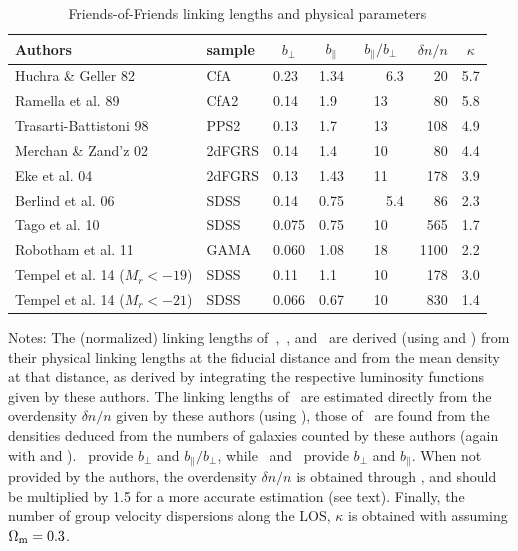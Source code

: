 \begin{table}
\caption{Friends-of-Friends linking lengths and physical
parameters\label{tab:groupalgos}}
\begin{center}
\setlength{\tabcolsep}{2.5pt}
\begin{tabular}{llllcrl}
\toprule%
\toprule%
Authors & sample & \multicolumn{1}{c}{$b_\perp$} & \multicolumn{1}{c}{$b_\parallel$} &
\multicolumn{1}{c}{$b_\parallel/b_\perp$} & $\delta n/
n$ & \multicolumn{1}{c}{$\kappa$} \\
\toprule%
Huchra \& Geller 82     & CfA     & 0.23  & 1.34  & \ \ \ \ 6.3  & 20    & 5.7 \\
Ramella et al. 89       & CfA2    & 0.14  & 1.9   & 13   & 80    & 5.8 \\
Trasarti-Battistoni 98  & PPS2    & 0.13  & 1.7   & 13   & 108   & 4.9\\
Merchan \& Zand'z 02    & 2dFGRS  & 0.14  & 1.4   & 10   & 80    & 4.4 \\
Eke et al. 04           & 2dFGRS  & 0.13  & 1.43  & 11   & 178   & 3.9\\
Berlind et al. 06       & SDSS    & 0.14  & 0.75  & \ \ \ \ 5.4  & 86    & 2.3 \\
Tago et al. 10          & SDSS    & 0.075  & 0.75  & 10   & 565  & 1.7\\
Robotham et al. 11      & GAMA    & 0.060  & 1.08  & 18   & 1100  & 2.2\\
Tempel et al. 14 ($M_r<-19$)        & SDSS    & 0.11  & 1.1 & 10 & 178 & 3.0 \\
Tempel et al. 14 ($M_r<-21$)        & SDSS    & 0.066  & 0.67 & 10 & 830 & 1.4
\\
\bottomrule%
\end{tabular}
\end{center}
\parbox{\hsize}{%
\footnotesize Notes: The (normalized) linking lengths
of~\cite{HG82},~\cite{RGH89}, and~\cite{TrasartiBattistoni98} are derived
(using  and ) from their
physical linking lengths at the fiducial distance and from the mean density at
that distance, as derived by integrating the respective luminosity functions
given by these authors. The linking lengths of~\cite{MZ02} are estimated
directly from the overdensity $\delta n/n$ given by these authors (using
), those of~\cite{Tago+10} are found from the
densities deduced from the numbers of galaxies counted by these authors (again
with  and ).~\cite{Eke+04}
provide $b_\perp$ and $b_\parallel/b_\perp$, while~\cite{Berlind+06}
and~\cite{Tempel+14} provide $b_\perp$ and $b_\parallel$. When not provided by
the authors, the overdensity $\delta n/n$ is obtained through
, and should be multiplied by 1.5 for a more
accurate estimation (see text). Finally, the number of group velocity
dispersions along the LOS, $\kappa$ is obtained with
 assuming $\Omega_{\rm m}=0.3$.
}
\end{table}

